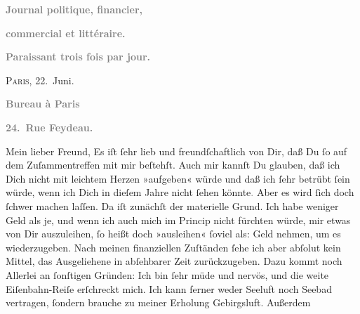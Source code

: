 \begin{ledgroupsized}[t]{13cm}
           \pstart
           \begin{otherlanguage}{french}\textcolor{gray}{\textbf{Journal politique,
                        financier,}}\end{otherlanguage}\pend
           \pstart
           \begin{otherlanguage}{french}\textcolor{gray}{\textbf{commercial et littéraire.}}\end{otherlanguage}\pend
           \pstart
           \begin{otherlanguage}{french}\textcolor{gray}{\textbf{\textbf{Paraissant trois fois par jour.}}}\end{otherlanguage}\hfill \textsc{Paris}, 22. Juni.\pend
           \pstart
           \begin{otherlanguage}{french}\textcolor{gray}{\textbf{\textbf{Bureau à Paris}}}\end{otherlanguage}\pend
           \pstart
           \begin{otherlanguage}{french}\textcolor{gray}{\textbf{\textbf{24. Rue Feydeau.}}}\end{otherlanguage}\pend
           \pstart{}Mein lieber Freund,\pend\pstart
           Es iſt ſehr lieb und freundſchaftlich von Dir, daß Du ſo auf dem Zuſammentreffen mit
               mir beſtehſt. Auch mir kannſt Du glauben, daß ich Dich nicht mit leichtem Herzen
               »aufgeben« würde und daß ich ſehr betrübt ſein würde, wenn ich Dich in dieſem Jahre
               nicht ſehen könnte\textcolor{gray}{.} Aber es wird ſich doch ſchwer machen laſſen.
               Da iſt zunächſt der materielle Grund. Ich habe weniger Geld als je, {\pb}und wenn ich auch mich im Princip nicht  fürchten würde, mir etwas von Dir auszuleihen, ſo
               heißt doch »ausleihen« ſoviel\strikeout{,} als: Geld nehmen, um
               es wiederzugeben. Nach meinen \label{T_L02778-1v}\label{T_L02778-1h} finanziellen Zuſtänden ſehe ich aber abſolut
               kein Mittel,  das Ausgeliehene in abſehbarer Zeit
               zurückzugeben. Dazu kommt noch Allerlei an ſonſtigen Gründen: Ich bin ſehr müde und
               nervös, und die weite Eiſenbahn-Reiſe erſchreckt mich. {\pb}Ich kann ferner weder Seeluft noch  Seebad vertragen, ſondern brauche zu meiner Erholung Gebirgsluft. Außerdem

\end{ledgroupsized}
